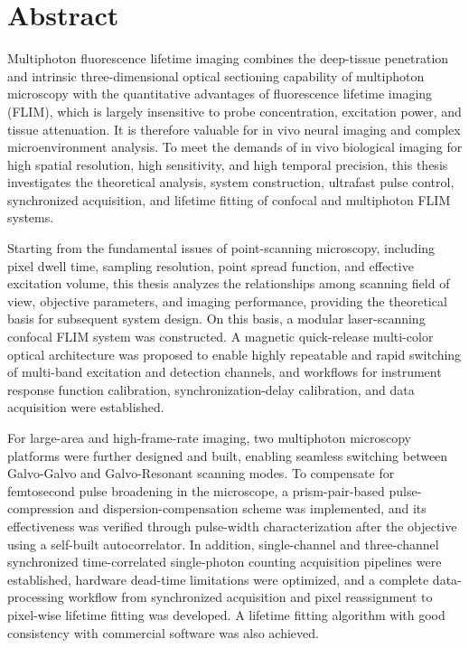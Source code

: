 \pagestyle{enfrontmatterstyle}%
\intobmk\chapter*{Abstract}%
\thispagestyle{enfrontmatterstyle}%
Multiphoton fluorescence lifetime imaging combines the deep-tissue penetration and intrinsic three-dimensional optical sectioning capability of multiphoton microscopy with the quantitative advantages of fluorescence lifetime imaging (FLIM), which is largely insensitive to probe concentration, excitation power, and tissue attenuation. It is therefore valuable for in vivo neural imaging and complex microenvironment analysis. To meet the demands of in vivo biological imaging for high spatial resolution, high sensitivity, and high temporal precision, this thesis investigates the theoretical analysis, system construction, ultrafast pulse control, synchronized acquisition, and lifetime fitting of confocal and multiphoton FLIM systems.

Starting from the fundamental issues of point-scanning microscopy, including pixel dwell time, sampling resolution, point spread function, and effective excitation volume, this thesis analyzes the relationships among scanning field of view, objective parameters, and imaging performance, providing the theoretical basis for subsequent system design. On this basis, a modular laser-scanning confocal FLIM system was constructed. A magnetic quick-release multi-color optical architecture was proposed to enable highly repeatable and rapid switching of multi-band excitation and detection channels, and workflows for instrument response function calibration, synchronization-delay calibration, and data acquisition were established.

For large-area and high-frame-rate imaging, two multiphoton microscopy platforms were further designed and built, enabling seamless switching between Galvo-Galvo and Galvo-Resonant scanning modes. To compensate for femtosecond pulse broadening in the microscope, a prism-pair-based pulse-compression and dispersion-compensation scheme was implemented, and its effectiveness was verified through pulse-width characterization after the objective using a self-built autocorrelator. In addition, single-channel and three-channel synchronized time-correlated single-photon counting acquisition pipelines were established, hardware dead-time limitations were optimized, and a complete data-processing workflow from synchronized acquisition and pixel reassignment to pixel-wise lifetime fitting was developed. A lifetime fitting algorithm with good consistency with commercial software was also achieved.

